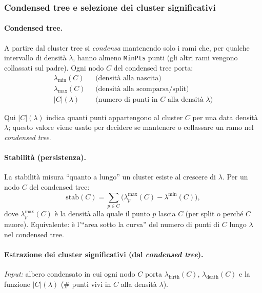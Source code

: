 \newpage
\subsubsection*{Condensed tree e selezione dei cluster significativi}
\paragraph{Condensed tree.} A partire dal cluster tree si \emph{condensa} mantenendo solo i rami che,
per qualche intervallo di densità \(\lambda\), hanno almeno \texttt{MinPts} punti (gli altri rami vengono
collassati sul padre). Ogni nodo \(C\) del condensed tree porta:
\[
\begin{aligned}
\lambda_{\text{min}}(C) &\;\text{ (densità alla nascita)}\\
\lambda_{\text{max}}(C) &\;\text{ (densità alla scomparsa/split)}\\
|C|(\lambda) &\;\text{ (numero di punti in $C$ alla densità }\lambda\text{)}
\end{aligned}
\]

Qui $|C|(\lambda)$ indica quanti punti appartengono al cluster $C$ per una data densità $\lambda$; 
questo valore viene usato per decidere se mantenere o collassare un ramo nel \emph{condensed tree}.

\paragraph{Stabilità (persistenza).} La stabilità misura “quanto a lungo” un cluster esiste al crescere di
\(\lambda\). Per un nodo \(C\) del condensed tree:
\[
\mathrm{stab}(C)=\sum_{p\in C}\!\bigl(\lambda^{\text{max}}_{p}(C)-\lambda^{\text{min}}(C)\bigr),
\]
dove \(\lambda^{\text{max}}_{p}(C)\) è la densità alla quale il punto \(p\) lascia \(C\) (per split o perché \(C\) muore).
Equivalente: è l’“area sotto la curva” del numero di punti di \(C\) lungo \(\lambda\) nel condensed tree.

\paragraph{Estrazione dei cluster significativi (dal \emph{condensed tree}).}
\emph{Input:} albero condensato in cui ogni nodo $C$ porta
$\lambda_{\text{birth}}(C)$, $\lambda_{\text{death}}(C)$ e la funzione $|C|(\lambda)$
(\# punti vivi in $C$ alla densità $\lambda$).

